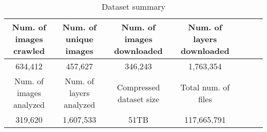 
\begin{table*}
	\centering
	\caption{Dataset summary} \label{tab-dataset-summary}
	\begin{tabular}{c|c|c|c|c|c|c}%
		\hline
		Num. of images crawled & Num. of unique images    & Num. of images downloaded  & Num. of layers downloaded \\
		\hline
		634,412                 & 457,627                 & 346,243                    & 1,763,354  \\
		\hline
		Num. of images analyzed & Num. of layers analyzed & Compressed dataset size              &  Total num. of files \\
		\hline
		319,620                     & 1,607,533                     & 51TB                        & 117,665,791  \\
		\hline
	\end{tabular}
\end{table*}

